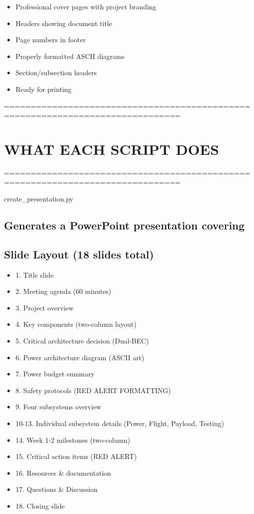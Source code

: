 \documentclass[11pt,letterpaper]{article}
\begin{document}
\begin{itemize}
  \item Professional cover pages with project branding
  \item Headers showing document title
  \item Page numbers in footer
  \item Properly formatted ASCII diagrams
  \item Section/subsection headers
  \item Ready for printing
\end{itemize}

===============================================================================\par

\section{WHAT EACH SCRIPT DOES}

===============================================================================\par

create\_presentation.py\par

\subsection{Generates a PowerPoint presentation covering}

\subsection{Slide Layout (18 slides total)}

\begin{itemize}
  \item 1. Title slide
  \item 2. Meeting agenda (60 minutes)
  \item 3. Project overview
  \item 4. Key components (two-column layout)
  \item 5. Critical architecture decision (Dual-BEC)
  \item 6. Power architecture diagram (ASCII art)
  \item 7. Power budget summary
  \item 8. Safety protocols (RED ALERT FORMATTING)
  \item 9. Four subsystems overview
  \item 10-13. Individual subsystem details (Power, Flight, Payload, Testing)
  \item 14. Week 1-2 milestones (two-column)
  \item 15. Critical action items (RED ALERT)
  \item 16. Resources \& documentation
  \item 17. Questions \& Discussion
  \item 18. Closing slide
\end{itemize}
\end{document}
